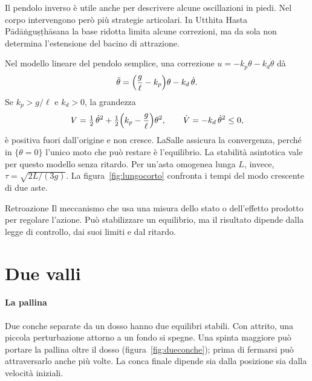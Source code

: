 \documentclass[11pt,a4paper,twoside=false,headinclude,footinclude]{scrartcl}
\begin{document}
Il pendolo inverso è utile anche per descrivere alcune oscillazioni in piedi. Nel corpo intervengono però più strategie articolari. In Utthita Hasta Pādāṅguṣṭhāsana la base ridotta limita alcune correzioni, ma da sola non determina l'estensione del bacino di attrazione.

\begin{formule}
Nel modello lineare del pendolo semplice, una correzione $u=-k_p\theta-k_d\dot\theta$ dà
\[
\ddot\theta=\Bigl(\frac{g}{\ell}-k_p\Bigr)\theta-k_d\,\dot\theta .
\]
Se $k_p>g/\ell$ e $k_d>0$, la grandezza
\[
V=\tfrac12\,\dot\theta^{2}+\tfrac12\Bigl(k_p-\frac{g}{\ell}\Bigr)\theta^{2},
\qquad
\dot V=-k_d\,\dot\theta^{2}\le 0 ,
\]
è positiva fuori dall'origine e non cresce. LaSalle assicura la convergenza, perché in $\{\dot\theta=0\}$ l'unico moto che può restare è l'equilibrio. La stabilità asintotica vale per questo modello senza ritardo. Per un'asta omogenea lunga $L$, invece, $\tau=\sqrt{2L/(3g)}$. La figura~\ref{fig:lungocorto} confronta i tempi del modo crescente di due aste.
\end{formule}

\begin{parola}{Retroazione}
Il meccanismo che usa una misura dello stato o dell'effetto prodotto per regolare l'azione. Può stabilizzare un equilibrio, ma il risultato dipende dalla legge di controllo, dai suoi limiti e dal ritardo.
\end{parola}

\section{Due valli}\label{sec:valli}

\paragraph{La pallina} Due conche separate da un dosso hanno due equilibri stabili. Con attrito, una piccola perturbazione attorno a un fondo si spegne. Una spinta maggiore può portare la pallina oltre il dosso (figura~\ref{fig:dueconche}); prima di fermarsi può attraversarlo anche più volte. La conca finale dipende sia dalla posizione sia dalla velocità iniziali.
\end{document}
